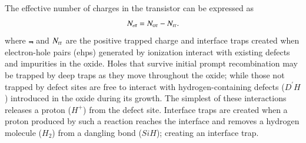 The effective number of charges in the transistor can be expressed as
\begin{equation}
N_{\mbox{\tiny{eff}}} = N_{\mbox{\tiny{OT}}} - N_{\mbox{\tiny{IT}}}. 
\label{eq:Neff}
\end{equation}
where ${\Not}$ and ${N_{\mbox{\tiny{IT}}}}$ are the positive trapped charge and interface traps created \cite{BarnabyTIDeffects} when electron-hole pairs (ehps) generated by ionization interact with existing defects and impurities in the oxide. Holes that survive initial prompt recombination may be trapped by deep traps as they move throughout the oxide; while those not trapped by defect sites are free to interact with hydrogen-containing defects ($D^{'}H$) introduced in the oxide during its growth. The simplest of these interactions releases a proton ($H^+$) from the defect site. Interface traps are created when a proton produced by such a reaction reaches the \interface interface and removes a hydrogen molecule ($H_2$) from a dangling bond (${SiH}$); creating an interface trap.

